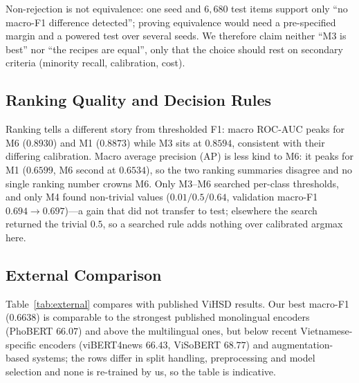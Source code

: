 Non-rejection is not equivalence: one seed and $6{,}680$ test items support only
``no macro-F1 difference detected''; proving equivalence would need a
pre-specified margin and a powered test over several seeds.  We therefore claim
neither ``M3 is best'' nor ``the recipes are equal'', only that the choice should
rest on secondary criteria (minority recall, calibration, cost).

\subsection{Ranking Quality and Decision Rules}
Ranking tells a different story from thresholded F1: macro ROC-AUC peaks for M6
($0.8930$) and M1 ($0.8873$) while M3 sits at $0.8594$, consistent with their
differing calibration.  Macro average precision (AP) is less kind to M6: it peaks
for M1 ($0.6599$, M6 second at $0.6534$), so the two ranking summaries disagree
and no single ranking number crowns M6.  Only M3--M6 searched per-class thresholds, and only M4
found non-trivial values ($0.01/0.5/0.64$, validation macro-F1 $0.694\to0.697$)---a
gain that did not transfer to test; elsewhere the search returned the trivial
$0.5$, so a searched rule adds nothing over calibrated argmax here.

\subsection{External Comparison}
\label{sec:external}
Table~\ref{tab:external} compares with published ViHSD results.  Our best
macro-F1 ($0.6638$) is comparable to the strongest published monolingual encoders
(PhoBERT $66.07$) and above the multilingual ones, but below recent
Vietnamese-specific encoders (viBERT4news $66.43$, ViSoBERT $68.77$) and
augmentation-based systems; the rows differ in split handling, preprocessing and
model selection and none is re-trained by us, so the table is indicative.

